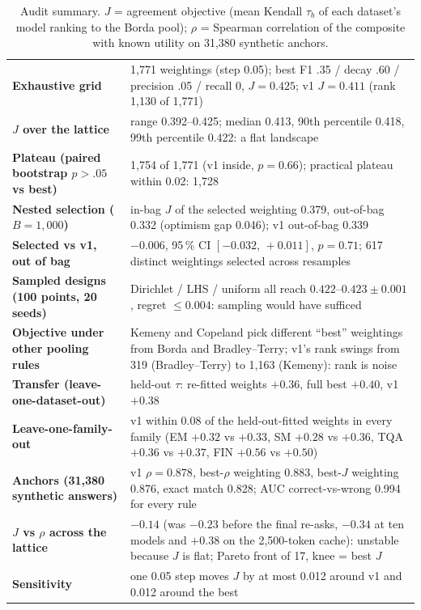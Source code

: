 \documentclass[11pt]{article}
\begin{document}
\begin{table}[htbp]
\centering\small
\caption{Audit summary. $J$ = agreement objective (mean Kendall $\tau_b$ of each dataset's model ranking to the Borda pool); $\rho$ = Spearman correlation of the composite with known utility on 31,380 synthetic anchors.}
\label{tab:summary}
\begin{tabularx}{\textwidth}{>{\bfseries}p{} L}
\toprule
Exhaustive grid & 1,771 weightings (step 0.05); best F1 .35 / decay .60 / precision .05 / recall 0, $J=0.425$; v1 $J=0.411$ (rank 1,130 of 1,771) \\
$J$ over the lattice & range 0.392--0.425; median 0.413, 90th percentile 0.418, 99th percentile 0.422: a flat landscape \\
Plateau (paired bootstrap $p>.05$ vs best) & 1,754 of 1,771 (v1 inside, $p=0.66$); practical plateau within 0.02: 1,728 \\
Nested selection ($B=1{,}000$) & in-bag $J$ of the selected weighting 0.379, out-of-bag 0.332 (optimism gap 0.046); v1 out-of-bag 0.339 \\
Selected vs v1, out of bag & $-0.006$, 95\,\% CI $[-0.032,\,+0.011]$, $p=0.71$; 617 distinct weightings selected across resamples \\
Sampled designs (100 points, 20 seeds) & Dirichlet / LHS / uniform all reach $0.422$--$0.423\pm0.001$, regret $\le 0.004$: sampling would have sufficed \\
Objective under other pooling rules & Kemeny and Copeland pick different ``best'' weightings from Borda and Bradley--Terry; v1's rank swings from 319 (Bradley--Terry) to 1,163 (Kemeny): rank is noise \\
Transfer (leave-one-dataset-out) & held-out $\tau$: re-fitted weights $+0.36$, full best $+0.40$, v1 $+0.38$ \\
Leave-one-family-out & v1 within 0.08 of the held-out-fitted weights in every family (EM $+0.32$ vs $+0.33$, SM $+0.28$ vs $+0.36$, TQA $+0.36$ vs $+0.37$, FIN $+0.56$ vs $+0.50$) \\
Anchors (31,380 synthetic answers) & v1 $\rho=0.878$, best-$\rho$ weighting 0.883, best-$J$ weighting 0.876, exact match 0.828; AUC correct-vs-wrong 0.994 for every rule \\
$J$ vs $\rho$ across the lattice & $-0.14$ (was $-0.23$ before the final re-asks, $-0.34$ at ten models and $+0.38$ on the 2,500-token cache): unstable because $J$ is flat; Pareto front of 17, knee = best $J$ \\
Sensitivity & one 0.05 step moves $J$ by at most 0.012 around v1 and 0.012 around the best \\

\end{tabularx}
\end{table}
\end{document}
